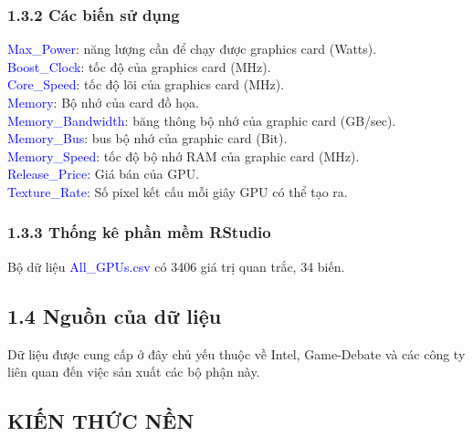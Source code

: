 \documentclass[a4paper]{article}
\newcommand{\gachdau}{\hspace*{1.5em}\ignorespaces}
\begin{document}
            \subsubsection*{1.3.2 Các biến sử dụng}
                \gachdau
                \textcolor{blue}{Max\_Power}: năng lượng cần để chạy được graphics card (Watts).\\
                \gachdau
                \textcolor{blue}{Boost\_Clock}: tốc độ của graphics card (MHz).\\
                \gachdau
                \textcolor{blue}{Core\_Speed}: tốc độ lõi của graphics card (MHz).\\
                \gachdau
                \textcolor{blue}{Memory}: Bộ nhớ của card đồ họa.\\
                \gachdau
                \textcolor{blue}{Memory\_Bandwidth}: băng thông bộ nhớ của graphic card (GB/sec).\\
                \gachdau
                \textcolor{blue}{Memory\_Bus}: bus bộ nhớ của graphic card (Bit).\\
                \gachdau
                \textcolor{blue}{Memory\_Speed}: tốc độ bộ nhớ RAM của graphic card (MHz).\\
                \gachdau
                \textcolor{blue}{Release\_Price}: Giá bán của GPU.\\
                \gachdau
                \textcolor{blue}{Texture\_Rate}: Số pixel kết cấu mỗi giây GPU có thể tạo ra.
    
            \subsubsection*{1.3.3 Thống kê phần mềm RStudio}
                \gachdau
                Bộ dữ liệu \textcolor{blue}{All\_GPUs.csv} có 3406 giá trị quan trắc, 34 biến.
                
    \subsection*{1.4 Nguồn của dữ liệu}
        \gachdau
        Dữ liệu được cung cấp ở đây chủ yếu thuộc về Intel, Game-Debate và các công ty liên quan đến việc sản xuất các bộ phận này.

\newpage
    \begin{center}
        \section*{KIẾN THỨC NỀN}
    \end{center}
\end{document}
